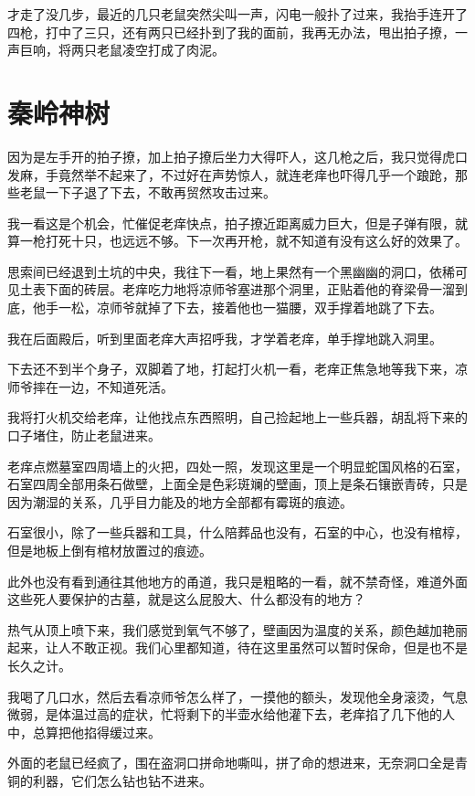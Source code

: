 才走了没几步，最近的几只老鼠突然尖叫一声，闪电一般扑了过来，我抬手连开了四枪，打中了三只，还有两只已经扑到了我的面前，我再无办法，甩出拍子撩，一声巨响，将两只老鼠凌空打成了肉泥。

\chapter{秦岭神树}

因为是左手开的拍子撩，加上拍子撩后坐力大得吓人，这几枪之后，我只觉得虎口发麻，手竟然举不起来了，不过好在声势惊人，就连老痒也吓得几乎一个踉跄，那些老鼠一下子退了下去，不敢再贸然攻击过来。

我一看这是个机会，忙催促老痒快点，拍子撩近距离威力巨大，但是子弹有限，就算一枪打死十只，也远远不够。下一次再开枪，就不知道有没有这么好的效果了。

思索间已经退到土坑的中央，我往下一看，地上果然有一个黑幽幽的洞口，依稀可见土表下面的砖层。老痒吃力地将凉师爷塞进那个洞里，正贴着他的脊梁骨一溜到底，他手一松，凉师爷就掉了下去，接着他也一猫腰，双手撑着地跳了下去。

我在后面殿后，听到里面老痒大声招呼我，才学着老痒，单手撑地跳入洞里。

下去还不到半个身子，双脚着了地，打起打火机一看，老痒正焦急地等我下来，凉师爷摔在一边，不知道死活。

我将打火机交给老痒，让他找点东西照明，自己捡起地上一些兵器，胡乱将下来的口子堵住，防止老鼠进来。

老痒点燃墓室四周墙上的火把，四处一照，发现这里是一个明显蛇国风格的石室，石室四周全部用条石做壁，上面全是色彩斑斓的壁画，顶上是条石镶嵌青砖，只是因为潮湿的关系，几乎目力能及的地方全部都有霉斑的痕迹。

石室很小，除了一些兵器和工具，什么陪葬品也没有，石室的中心，也没有棺椁，但是地板上倒有棺材放置过的痕迹。

此外也没有看到通往其他地方的甬道，我只是粗略的一看，就不禁奇怪，难道外面这些死人要保护的古墓，就是这么屁股大、什么都没有的地方？

热气从顶上喷下来，我们感觉到氧气不够了，壁画因为温度的关系，颜色越加艳丽起来，让人不敢正视。我们心里都知道，待在这里虽然可以暂时保命，但是也不是长久之计。

我喝了几口水，然后去看凉师爷怎么样了，一摸他的额头，发现他全身滚烫，气息微弱，是体温过高的症状，忙将剩下的半壶水给他灌下去，老痒掐了几下他的人中，总算把他掐得缓过来。

外面的老鼠已经疯了，围在盗洞口拼命地嘶叫，拼了命的想进来，无奈洞口全是青铜的利器，它们怎么钻也钻不进来。

